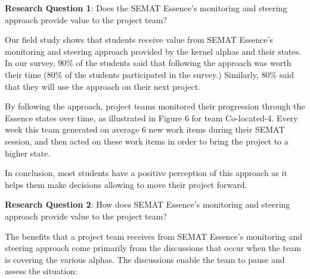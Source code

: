 \textbf{Research Question 1}: Does the SEMAT Essence's monitoring and steering approach provide value to the project team?

Our field study shows that students receive value from SEMAT Essence's monitoring and steering approach provided by the kernel alphas and their states. In our survey, 90\% of the students said that following the approach was worth their time (80\% of the students participated in the survey.) Similarly, 80\% said that they will use the approach on their next project.

By following the approach, project teams monitored their progression through the Essence states over time, as illustrated in Figure 6 for team Co-located-4. Every week this team generated on average 6 new work items during their SEMAT session, and then acted on these work items in order to bring the project to a higher state.

In conclusion, most students have a positive perception of this approach as it helps them make decisions allowing to move their project forward.

\textbf{Research Question 2}: How does SEMAT Essence's monitoring and steering approach provide value to the project team?

The benefits that a project team receives from SEMAT Essence's monitoring and steering approach come primarily from the discussions that occur when the team is covering the various alphas. The discussions enable the team to pause and assess the situation:

